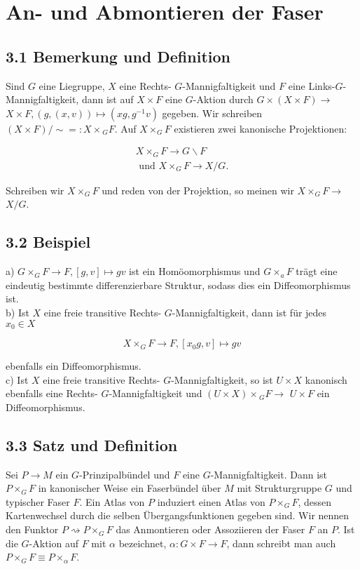 \documentclass[10pt, letterpaper]{article}
\begin{document}
\pagebreak

\section{An- und Abmontieren der Faser}

\subsection*{3.1 Bemerkung und Definition}
Sind $G$ eine Liegruppe, $X$ eine Rechts- $G$-Mannigfaltigkeit und $F$ eine Links-$G$-Mannigfaltigkeit, dann ist auf $X \times F$ eine $G$-Aktion durch $G \times(X \times F) \rightarrow$ $X \times F,(g,(x, v)) \mapsto\left(x g, g^{-1} v\right)$ gegeben. Wir schreiben $(X \times F) / \sim=: X \times{ }_{G} F$. Auf $X \times_{G} F$ existieren zwei kanonische Projektionen:

$$
\begin{gathered}
X \times_{G} F \rightarrow G \backslash F \\
\text { und } X \times_{G} F \rightarrow X / G .
\end{gathered}
$$

Schreiben wir $X \times_{G} F$ und reden von der Projektion, so meinen wir $X \times_{G} F \rightarrow$ $X / G$.

\subsection*{3.2 Beispiel}
a) $G \times_{G} F \rightarrow F,[g, v] \mapsto g v$ ist ein Homöomorphismus und $G \times_{a} F$ trägt eine eindeutig bestimmte differenzierbare Struktur, sodass dies ein Diffeomorphismus ist.\\
b) Ist $X$ eine freie transitive Rechts- $G$-Mannigfaltigkeit, dann ist für jedes $x_{0} \in X$

$$
X \times_{G} F \rightarrow F,\left[x_{0} g, v\right] \mapsto g v
$$

ebenfalls ein Diffeomorphismus.\\
c) Ist $X$ eine freie transitive Rechts- $G$-Mannigfaltigkeit, so ist $U \times X$ kanonisch ebenfalls eine Rechts- $G$-Mannigfaltigkeit und $(U \times X) \times{ }_{G} F \rightarrow$ $U \times F$ ein Diffeomorphismus.

\subsection*{3.3 Satz und Definition}
Sei $P \rightarrow M$ ein $G$-Prinzipalbündel und $F$ eine $G$-Mannigfaltigkeit. Dann ist $P \times_{G} F$ in kanonischer Weise ein Faserbündel über $M$ mit Strukturgruppe $G$ und typischer Faser $F$. Ein Atlas von $P$ induziert einen Atlas von $P \times_{G} F$, dessen Kartenwechsel durch die selben Übergangsfunktionen gegeben sind. Wir nennen den Funktor $P \rightsquigarrow P \times_{G} F$ das Anmontieren oder Assoziieren der Faser $F$ an $P$. Ist die $G$-Aktion auf $F$ mit $\alpha$ bezeichnet, $\alpha: G \times F \rightarrow F$, dann schreibt man auch $P \times_{G} F \equiv P \times_{\alpha} F$.
\end{document}
